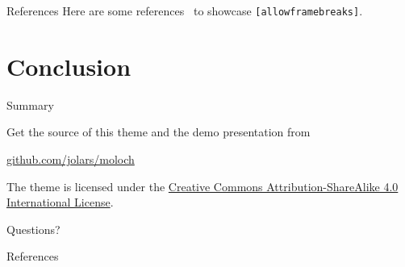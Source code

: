 \documentclass[10pt]{beamer}
\begin{document}
\begin{frame}[fragile]{References}
  Here are some references~\cite{Knuth92,ConcreteMath,Simpson,Er01,greenwade93} to showcase \verb+[allowframebreaks]+.
\end{frame}

\section{Conclusion}

\begin{frame}{Summary}

  Get the source of this theme and the demo presentation from
  \begin{center}
    \url{github.com/jolars/moloch}
  \end{center}

  The theme is licensed under the
  \href{http://creativecommons.org/licenses/by-sa/4.0/}{Creative Commons Attribution-ShareAlike 4.0 International License}.

  \begin{center}
    \ccbysa
  \end{center}

\end{frame}

\begin{frame}[standout]
  Questions?
\end{frame}

\appendix

\begin{frame}[allowframebreaks]{References}

  
  

\end{frame}
\end{document}
